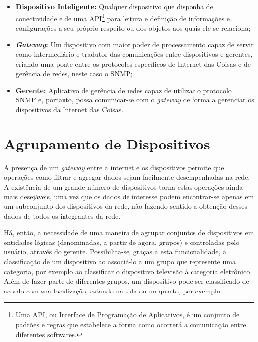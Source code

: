 \documentclass[twoside,english,brazilian]{UNISINOSmonografia}
\begin{document}
\begin{itemize}

	\item \textbf{Dispositivo Inteligente:}
Qualquer dispositivo que disponha de conectividade e de uma API\footnote{
	Uma API, ou Interface de Programação de Aplicativos, é um conjunto de 
	padrões e regras que estabelece a forma como ocorrerá a comunicação entre 
	diferentes softwares.
} para leitura e definição de informações e configurações a seu próprio 
respeito ou dos objetos aos quais ele se relaciona;

	\item \textbf{\textit{Gateway}:}
Um dispositivo com maior poder de processamento capaz de servir como 
intermediário e tradutor das comunicações entre dispositivos e gerentes, 
criando uma ponte entre os protocolos específicos de Internet das Coisas e de 
gerência de redes, neste caso o \hyperref[siglas]{SNMP};

	\item \textbf{Gerente:}
Aplicativo de gerência de redes capaz de utilizar o protocolo \hyperref[siglas]{SNMP} e, 
portanto, possa comunicar-se com o \textit{gateway} de forma a gerenciar os 
dispositivos da Internet das Coisas.

\end{itemize}


\section{Agrupamento de Dispositivos}

A presença de um \textit{gateway} entre a internet e os dispositivos permite 
que operações como filtrar e agregar dados sejam facilmente desempenhadas na 
rede.
A existência de um grande número de dispositivos torna estas operações ainda 
mais desejáveis, uma vez que os dados de interesse podem encontrar-se apenas 
em um subconjunto dos dispositivos da rede, não fazendo sentido a obtenção 
desses dados de todos os integrantes da rede.


Há, então, a necessidade de uma maneira de agrupar conjuntos de dispositivos 
em entidades lógicas (denominadas, a partir de agora, grupos) e controladas 
pelo usuário, através do gerente.
Possibilita-se, graças a esta funcionalidade, a classificação de um 
dispositivo ao associá-lo a um grupo que represente uma categoria, por exemplo 
ao classificar o dispositivo televisão à categoria eletrônico.
Além de fazer parte de diferentes grupos, um dispositivo pode ser 
classificado de acordo com sua localização, estando na sala ou no quarto, por 
exemplo.
\end{document}
